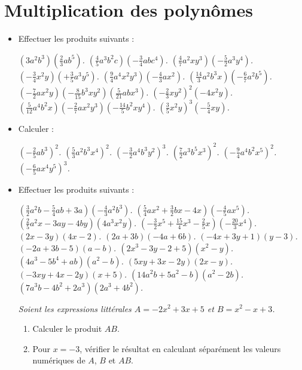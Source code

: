 
 \chapter{Multiplication des polynômes}
  
\begin{itemize}
\item Effectuer les produits suivants : 
\begin{itemize}
\it $(3a^2b^3)\left(\frac23ab^5\right)$.
\it $\left(\frac45a^3b^2c\right)\left(-\frac34abc^4\right)$. 
\it $\left(\frac47a^2xy^3\right)\left(-\frac52a^3y^4\right)$.
\it $\left(-\frac34x^2y\right)\left(+\frac35a^3y^5\right)$.
\it $\left(\frac94a^4x^2y^3\right)\left(-\frac43ax^2\right)$. 
\it $\left(\frac{14}3a^2b^3x\right)\left(-\frac67a^2b^5\right)$. 
\it $\left(-\frac72ax^2y\right)\left(-\frac8{15}b^3xy^2\right)\left(\frac5{21}abx^3\right)$.
\it $\left(-\frac23xy^2\right)^2(-4x^2y)$.
\it $\left(\frac5{12}a^4b^2x\right)\left(-\frac27ax^2y^3\right)\left(-\frac{14}5b^2xy^4\right)$.
\it $\left(\frac35x^2y\right)^3\left(-\frac54xy\right)$.
\end{itemize}
\item Calculer : \begin{itemize}
\it $\left(-\frac25ab^3\right)^2$.
\it $\left(\frac53a^2b^3x^4\right)^2$.
\it $\left(-\frac32a^4b^3y^2\right)^3$.
\it $\left(\frac72a^3b^5x^3\right)^2$.
\it $\left(-\frac94a^4b^2x^5\right)^2$.
\it $\left(-\frac65ax^4y^5\right)^3$.
\end{itemize}
\item Effectuer les produits suivants : 
\begin{itemize}
\it $\left(\frac32a^2b-\frac54ab+3a\right)\left(-\frac43a^2b^3\right)$.
\it $\left(\frac54ax^2+\frac32bx-4x\right)\left(-\frac45ax^5\right)$.
\it $\left(\frac25a^2x-3ay-4by\right)(4a^3x^2y)$.
\it $\left(-\frac32x^5+\frac{15}4x^3-\frac25x\right)\left(-\frac{20}3x^4\right)$.
\it $(2x-3y)(4x-2)$.
\it $(2a+3b)(-4a+6b)$.
\it $(-4x+3y+1)(y-3)$. 
\it $(-2a+3b-5)(a-b)$. 
\it $(2x^3-3y-2+5)(x^2-y)$.
\it $(4a^3-5b^4+ab)(a^2-b)$.
\it $(5xy+3x-2y)(2x-y)$.
\it $(-3xy+4x-2y)(x+5)$.
\it $(14a^2b+5a^2-b)(a^2-2b)$.
\it $(7a^3b-4b^2+2a^3)(2a^3+4b^2)$. 
\end{itemize}
\it Soient les expressions littérales $A=-2x^2+3x+5$ et $B=x^2-x+3$. 
\begin{enumerate}
\item Calculer le produit $AB$. 
\item Pour $x=-3$, vérifier le résultat en calculant séparément les valeurs numériques de $A$, $B$ et $AB$. 

\end{enumerate}
\end{itemize}
